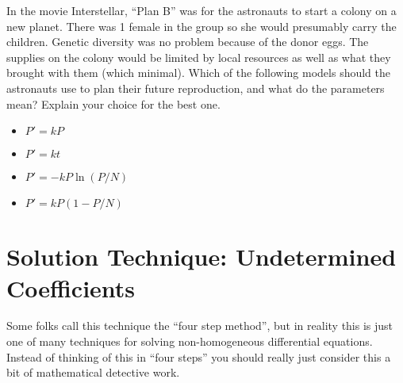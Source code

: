 \begin{problem}
    In the movie Interstellar, ``Plan B'' was for the astronauts to start a colony on a new
    planet.  There was 1 female in the group so she would presumably carry the children.
    Genetic diversity was no problem because of the donor eggs.  The supplies on the colony
    would be limited by local resources as well as what they brought with them
    (which minimal).  Which of the following models should the astronauts use to plan
    their future reproduction, and what do the parameters mean?  Explain your choice for the best one.
    \begin{itemize}
        \item $P' = kP$
        \item $P' = kt$
        \item $P' = -kP\ln(P/N)$
        \item $P' = kP(1-P/N) $
    \end{itemize}
\end{problem}


\newpage\section{Solution Technique: Undetermined Coefficients}
Some folks call this technique the ``four step method'', but in reality this is just one
of many techniques for solving non-homogeneous differential equations.  Instead of
thinking of this in ``four steps'' you should really just consider this a bit of
mathematical detective work.  

